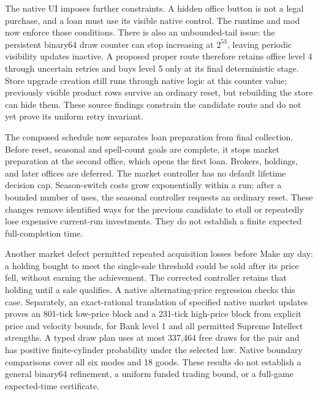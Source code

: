 \documentclass[11pt,a4paper]{article}
\numberwithin{equation}{section}
\theoremstyle{definition}
\theoremstyle{remark}
\begin{document}
The native UI imposes further constraints. A hidden office button is not a legal purchase, and a loan must use its visible native control. The runtime and mod now enforce those conditions. There is also an unbounded-tail issue: the persistent binary64 draw counter can stop increasing at $2^{53}$, leaving periodic visibility updates inactive. A proposed proper route therefore retains office level 4 through uncertain retries and buys level 5 only at its final deterministic stage. Store upgrade creation still runs through native logic at this counter value; previously visible product rows survive an ordinary reset, but rebuilding the store can hide them. These source findings constrain the candidate route and do not yet prove its uniform retry invariant.

The composed schedule now separates loan preparation from final collection. Before reset, seasonal and spell-count goals are complete, it stops market preparation at the second office, which opens the first loan. Brokers, holdings, and later offices are deferred. The market controller has no default lifetime decision cap. Season-switch costs grow exponentially within a run; after a bounded number of uses, the seasonal controller requests an ordinary reset. These changes remove identified ways for the previous candidate to stall or repeatedly lose expensive current-run investments. They do not establish a finite expected full-completion time.

Another market defect permitted repeated acquisition losses before Make my day: a holding bought to meet the single-sale threshold could be sold after its price fell, without earning the achievement. The corrected controller retains that holding until a sale qualifies. A native alternating-price regression checks this case. Separately, an exact-rational translation of specified native market updates proves an 801-tick low-price block and a 231-tick high-price block from explicit price and velocity bounds, for Bank level 1 and all permitted Supreme Intellect strengths. A typed draw plan uses at most 337,464 free draws for the pair and has positive finite-cylinder probability under the selected law. Native boundary comparisons cover all six modes and 18 goods. These results do not establish a general binary64 refinement, a uniform funded trading bound, or a full-game expected-time certificate.
\end{document}
